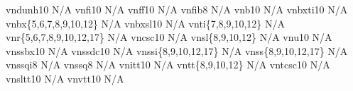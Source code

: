 \documentclass[test]{vnsample}
\begin{document}
\begin{shortsample}
   {vndunh10}                  {N/A}
  {vnfi10}                    {N/A}
   {vnff10}                    {N/A}
  {vnfib8}                    {N/A}
    {vnb10}                     {N/A}
  {vnbxti10}                  {N/A}
   {vnbx\{5,6,7,8,9,10,12\}}   {N/A}
  {vnbxsl10}                  {N/A}
   {vnti\{7,8,9,10,12\}}       {N/A}
    {vnr\{5,6,7,8,9,10,12,17\}} {N/A}
   {vncsc10}                   {N/A}
   {vnsl\{8,9,10,12\}}         {N/A}
   {vnu10}                     {N/A}
  {vnssbx10}                  {N/A}
 {vnssdc10}                  {N/A}
  {vnssi\{8,9,10,12,17\}}     {N/A}
   {vnss\{8,9,10,12,17\}}      {N/A}
 {vnssqi8}                   {N/A}
  {vnssq8}                    {N/A}
  {vnitt10}                   {N/A}
   {vntt\{8,9,10,12\}}         {N/A}
  {vntcsc10}                  {N/A}
  {vnsltt10}                  {N/A}
  {vnvtt10}                   {N/A}
\end{shortsample}
\end{document}
